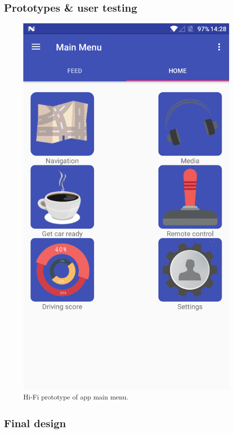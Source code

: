\documentclass{article}
\begin{document}
\begin{itemize}
\subsection{Prototypes \& user testing}
  \begin{figure}[H]
    \centering
    \includegraphics[scale=0.25]{main-menu}
    \caption{Hi-Fi prototype of app main menu.}
    \label{main-menu}
  \end{figure}
\subsection{Final design}


\end{itemize}
\end{document}
